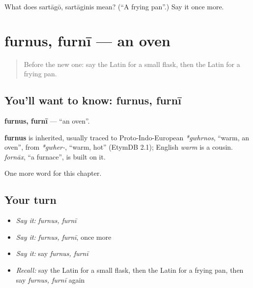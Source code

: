 \begin{tcolorbox}[breakable,colback=teal!4,colframe=teal!35!black,title={Before you move on}]
What does sartāgō, sartāginis mean? (\textquotedblleft{}A frying pan\textquotedblright{}.) Say it once more.
\end{tcolorbox}
\section[furnus, furnī]{furnus, furnī — an oven}

\label{lesson:LA-C252-furnus}



\begin{quote}
Before the new one: say the Latin for a small flask, then the Latin for a frying pan.
\end{quote}

\subsection*{You'll want to know: furnus, furnī}
\textbf{furnus, furnī} — \textquotedblleft{}an oven\textquotedblright{}.

\begin{cousinweb}
\textbf{furnus} is inherited, usually traced to Proto-Indo-European \emph{*gwhrnos}, \textquotedblleft{}warm, an oven\textquotedblright{}, from \emph{*gwher-}, \textquotedblleft{}warm, hot\textquotedblright{} (EtymDB 2.1); English \emph{warm} is a cousin. \emph{fornāx}, \textquotedblleft{}a furnace\textquotedblright{}, is built on it.
\end{cousinweb}

\begin{grammarlens}[title={What you've built}]
One more word for this chapter.
\end{grammarlens}

\subsection*{Your turn}
\begin{itemize}
\raggedright
  \item \emph{Say it:} \emph{furnus, furnī}
  \item \emph{Say it:} \emph{furnus, furnī}, once more
  \item \emph{Say it:} say \emph{furnus, furnī}
  \item \emph{Recall:} say the Latin for a small flask, then the Latin for a frying pan, then say \emph{furnus, furnī} again
\end{itemize}

